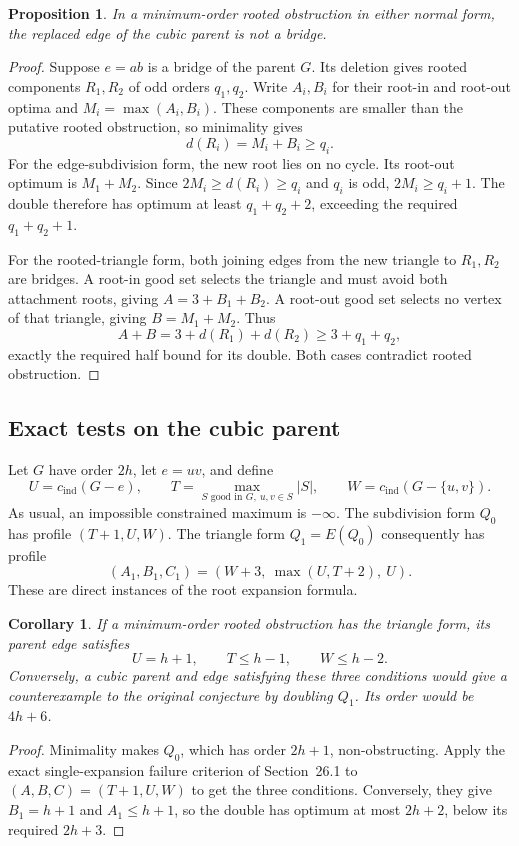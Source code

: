 \documentclass[11pt]{article}
\newtheorem{proposition}[theorem]{Proposition}
\newtheorem{corollary}[theorem]{Corollary}
\newcommand{\cind}{c_{\mathrm{ind}}}
\begin{document}
\begin{proposition}\label{prop:nonbridge-parent-edge}
In a minimum-order rooted obstruction in either normal form, the
replaced edge of the cubic parent is not a bridge.
\end{proposition}
\begin{proof}
Suppose $e=ab$ is a bridge of the parent $G$. Its deletion gives
rooted components $R_1,R_2$ of odd orders $q_1,q_2$. Write $A_i,B_i$
for their root-in and root-out optima and $M_i=\max(A_i,B_i)$.
These components are smaller than the putative rooted obstruction,
so minimality gives
\[
 d(R_i)=M_i+B_i\geq q_i.
\]
For the edge-subdivision form, the new root lies on no cycle. Its
root-out optimum is $M_1+M_2$. Since $2M_i\geq d(R_i)\geq q_i$
and $q_i$ is odd, $2M_i\geq q_i+1$. The double therefore has optimum
at least $q_1+q_2+2$, exceeding the required $q_1+q_2+1$.

For the rooted-triangle form, both joining edges from the new triangle
to $R_1,R_2$ are bridges. A root-in good set selects the triangle and
must avoid both attachment roots, giving
$A=3+B_1+B_2$. A root-out good set selects no vertex of that triangle,
giving $B=M_1+M_2$. Thus
\[
 A+B=3+d(R_1)+d(R_2)\geq3+q_1+q_2,
\]
exactly the required half bound for its double. Both cases contradict
rooted obstruction.
\end{proof}

\subsection{Exact tests on the cubic parent}
Let $G$ have order $2h$, let $e=uv$, and define
\[
 U=\cind(G-e),\qquad
 T=\max_{S\text{ good in }G,\ u,v\in S}|S|,\qquad
 W=\cind(G-\{u,v\}).
\]
As usual, an impossible constrained maximum is $-\infty$.
The subdivision form $Q_0$ has profile $(T+1,U,W)$.
The triangle form $Q_1=E(Q_0)$ consequently has profile
\[
 (A_1,B_1,C_1)=(W+3,\ \max(U,T+2),\ U).
\]
These are direct instances of the root expansion formula.

\begin{corollary}\label{cor:parent-triangle-obstruction}
If a minimum-order rooted obstruction has the triangle form, its
parent edge satisfies
\[
 U=h+1,\qquad T\leq h-1,\qquad W\leq h-2.
\]
Conversely, a cubic parent and edge satisfying these three conditions
would give a counterexample to the original conjecture by doubling
$Q_1$. Its order would be $4h+6$.
\end{corollary}
\begin{proof}
Minimality makes $Q_0$, which has order $2h+1$, non-obstructing.
Apply the exact single-expansion failure criterion of Section~26.1
to $(A,B,C)=(T+1,U,W)$ to get the three conditions.
Conversely, they give $B_1=h+1$ and $A_1\leq h+1$, so the double
has optimum at most $2h+2$, below its required $2h+3$.
\end{proof}
\end{document}
